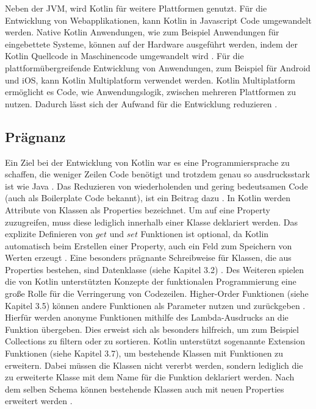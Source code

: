 \documentclass{article}
\begin{document}
Neben der JVM, wird Kotlin für weitere Plattformen genutzt. Für die Entwicklung von Webapplikationen, kann Kotlin in Javascript Code umgewandelt werden. Native Kotlin Anwendungen, wie zum Beispiel Anwendungen für eingebettete Systeme, können auf der Hardware ausgeführt werden, indem der Kotlin Quellcode in Maschinencode umgewandelt wird \cite{KotlinLangDocFAQ}. \newline
Für die plattformübergreifende Entwicklung von Anwendungen, zum Beispiel für Android und iOS, kann Kotlin Multiplatform verwendet werden. Kotlin Multiplatform ermöglicht es Code, wie Anwendungslogik, zwischen mehreren Plattformen zu nutzen. Dadurch lässt sich der Aufwand für die Entwicklung reduzieren \cite{KotlinLangDocMulti}.
\subsection{Prägnanz}
Ein Ziel bei der Entwicklung von Kotlin war es eine Programmiersprache zu schaffen, die weniger Zeilen Code benötigt und trotzdem genau so ausdrucksstark ist wie Java \cite{Kotlin_In-D}. Das Reduzieren von wiederholenden und gering bedeutsamen Code (auch als Boilerplate Code bekannt), ist ein Beitrag dazu \cite{KotlinLangDoc}. In Kotlin werden Attribute von Klassen als Properties bezeichnet. Um auf eine Property zuzugreifen, muss diese lediglich innerhalb einer Klasse deklariert werden. Das explizite Definieren von $get$ und $set$ Funktionen ist optional, da Kotlin automatisch beim Erstellen einer Property, auch ein Feld zum Speichern von Werten erzeugt \cite{KotlinLangDoc}. Eine besonders prägnante Schreibweise für Klassen, die aus Properties bestehen, sind Datenklasse (siehe Kapitel 3.2) \cite{KotlinLangDoc}.
Des Weiteren spielen die von Kotlin unterstützten Konzepte der funktionalen Programmierung eine große Rolle für die Verringerung von Codezeilen. Higher-Order Funktionen (siehe Kapitel 3.5) können andere Funktionen als Parameter nutzen und zurückgeben \cite{KotlinLangDoc}. Hierfür werden anonyme Funktionen mithilfe des Lambda-Ausdrucks an die Funktion übergeben. Dies erweist sich als besonders hilfreich, um zum Beispiel Collections zu filtern oder zu sortieren. \newline
Kotlin unterstützt sogenannte Extension Funktionen (siehe Kapitel 3.7), um bestehende Klassen mit Funktionen zu erweitern. Dabei müssen die Klassen nicht vererbt werden, sondern lediglich die zu erweiterte Klasse mit dem Name für die Funktion deklariert werden. Nach dem selben Schema können bestehende Klassen auch mit neuen Properties erweitert werden \cite{KotlinLangDoc}.
\end{document}
